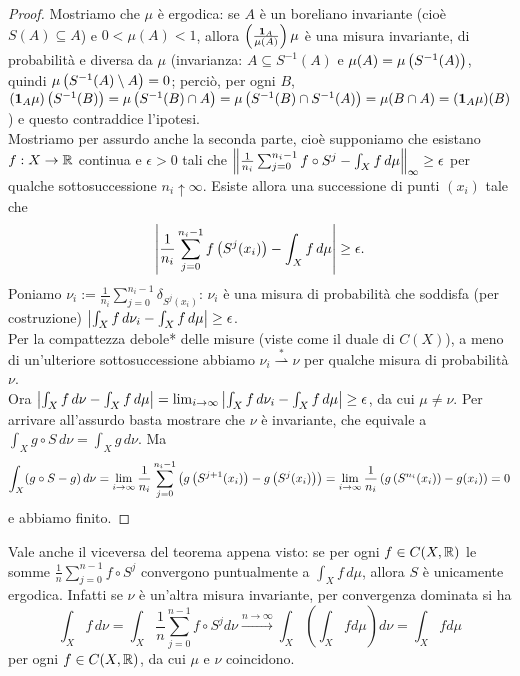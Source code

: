 \begin{proof}Mostriamo che $\mu$ è ergodica: se $A$ è un boreliano invariante (cioè $S(A)\subseteq A$)
e $0<\mu(A)<1$, allora $\left(\frac{\bm{1}_A}{\mu(A)}\right)\mu$ è una misura invariante, di probabilità e diversa da $\mu$
(invarianza: $A\subseteq S^{-1}(A)$ e $\mu(A)=\mu\left(S^{-1}(A)\right)$, quindi $\mu\left(S^{-1}(A)\setminus A\right)=0$;
perciò, per ogni $B$, $(\bm{1}_A\mu)\left(S^{-1}(B)\right)=\mu\left(S^{-1}(B)\cap A\right)=\mu\left(S^{-1}(B)\cap S^{-1}(A)\right)=\mu(B\cap A)=(\bm{1}_A\mu)(B)$)
e questo contraddice l'ipotesi. \\
Mostriamo per assurdo anche la seconda parte, cioè supponiamo che esistano $f:X\to\mathbb{R}$ continua e $\epsilon>0$ tali che
$\left\|\frac{1}{n_i}\sum_{j=0}^{n_i-1}f\circ S^j-\int_X f\,d\mu\right\|_\infty\ge\epsilon$ per qualche sottosuccessione $n_i\uparrow\infty$.
Esiste allora una successione di punti $(x_i)$ tale che
\[ \left|\frac{1}{n_i}\sum_{j=0}^{n_i-1}f\left(S^j(x_i)\right)-\int_X f\,d\mu\right|\ge\epsilon. \]
Poniamo $\nu_i:=\frac{1}{n_i}\sum_{j=0}^{n_i-1}\delta_{S^j(x_i)}$: $\nu_i$ è una misura di probabilità che soddisfa (per costruzione)
$\left|\int_X f\,d\nu_i-\int_X f\,d\mu\right|\ge\epsilon$. \\
Per la compattezza debole* delle misure (viste come il duale di $C(X)$), a meno di un'ulteriore sottosuccessione
abbiamo $\nu_i\overset{*}{\rightharpoonup}\nu$ per qualche misura di probabilità $\nu$. \\
Ora $\left|\int_X f\,d\nu-\int_X f\,d\mu\right|=\lim_{i\to\infty}\left|\int_X f\,d\nu_i-\int_X f\,d\mu\right|\ge\epsilon$, da cui $\mu\neq\nu$.
Per arrivare all'assurdo basta mostrare che $\nu$ è invariante, che equivale a $\int_X g\circ S\,d\nu=\int_X g\,d\nu$. Ma
\[ \int_X (g\circ S-g)\,d\nu=\lim_{i\to\infty}\frac{1}{n_i}\sum_{j=0}^{n_i-1}\left(g\left(S^{j+1}(x_i)\right)-g\left(S^j(x_i)\right)\right)
=\lim_{i\to\infty}\frac{1}{n_i}\left(g\left(S^{n_i}(x_i)\right)-g(x_i)\right)=0 \]
e abbiamo finito.
\end{proof}

\begin{oss}[facoltativa] Vale anche il viceversa del teorema appena visto: se per ogni $f\in C(X,\mathbb{R})$ le somme $\frac{1}{n}\sum_{j=0}^{n-1}f\circ S^j$ 
convergono puntualmente a $\int_X f\,d\mu$, allora $S$ è unicamente ergodica. Infatti se $\nu$ è un'altra misura invariante, per convergenza dominata si ha
\[\int_X f\,d\nu=\int_X \frac{1}{n}\sum_{j=0}^{n-1}f\circ S^j d\nu \xrightarrow{n\rightarrow\infty}\int_X \left(\int_X f d\mu\right)d\nu=\int_X f d\mu\]
per ogni $f\in C(X,\mathbb{R})$, da cui $\mu$ e $\nu$ coincidono.
\end{oss}



